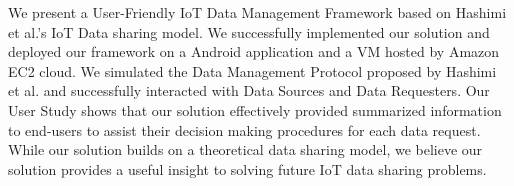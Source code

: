 We present a User-Friendly IoT Data Management Framework based on Hashimi et al.'s IoT Data sharing model. We successfully implemented our solution and deployed our framework on a Android application and a VM hosted by Amazon EC2 cloud. We simulated the Data Management Protocol proposed by Hashimi et al. and successfully interacted with Data Sources and Data Requesters. Our User Study shows that our solution effectively provided summarized information to end-users to assist their decision making procedures for each data request. While our solution builds on a theoretical data sharing model, we believe our solution provides a useful insight to solving future IoT data sharing problems.